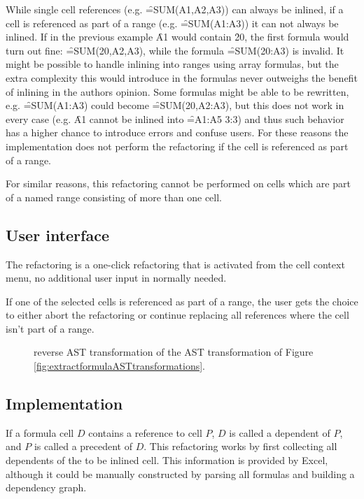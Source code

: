While single cell references (e.g. \f{=SUM(A1,A2,A3)}) can always be inlined, if a cell is referenced as part of a range (e.g. \f{=SUM(A1:A3)}) it can not always be inlined.
If in the previous example \f{A1} would contain \f{20}, the first formula would turn out fine: \f{=SUM(20,A2,A3)}, while the formula \f{=SUM(20:A3)} is invalid.
It might be possible to handle inlining into ranges using array formulas, but the extra complexity this would introduce in the formulas never outweighs the benefit of inlining in the authors opinion.
Some formulas might be able to be rewritten, e.g. \f{=SUM(A1:A3)} could become \f{=SUM(20,A2:A3)}, but this does not work in every case (e.g. \f{A1} cannot be inlined into \f{=A1:A5 3:3}) and thus such behavior has a higher chance to introduce errors and confuse users.
For these reasons the implementation does not perform the refactoring if the cell is referenced as part of a range.

For similar reasons, this refactoring cannot be performed on cells which are part of a named range consisting of more than one cell.

\subsection{User interface}

The refactoring is a one-click refactoring that is activated from the cell context menu, no additional user input in normally needed.

If one of the selected cells is referenced as part of a range, the user gets the choice to either abort the refactoring or continue replacing all references where the cell isn't part of a range.

\begin{figure}
	\centering
	
	\caption{ reverse AST transformation of the  AST transformation of Figure \ref{fig:extractformulaASTtransformations}.}
	\label{fig:inlineformulaAST}
\end{figure}

\subsection{Implementation}

If a formula cell $D$ contains a reference to cell $P$, $D$ is called a dependent of $P$, and $P$ is called a precedent of $D$.
This refactoring works by first collecting all dependents of the to be inlined cell.
This information is provided by Excel, although it could be manually constructed by parsing all formulas and building a dependency graph.


